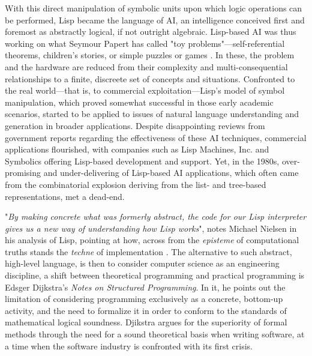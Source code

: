With this direct manipulation of symbolic units upon which logic operations can be performed, Lisp became the language of AI, an intelligence conceived first and foremost as abstractly logical, if not outright algebraic. Lisp-based AI was thus working on what Seymour Papert has called "toy problems"—self-referential theorems, children's stories, or simple puzzles or games \citep{nilsson_early_2009}. In these, the problem and the hardware are reduced from their complexity and multi-consequential relationships to a finite, discreete set of concepts and situations. Confronted to the real world—that is, to commercial exploitation—Lisp's model of symbol manipulation, which proved somewhat successful in those early academic scenarios, started to be applied to issues of natural language understanding and generation in broader applications. Despite disappointing reviews from government reports regarding the effectiveness of these AI techniques, commercial applications flourished, with companies such as Lisp Machines, Inc. and Symbolics offering Lisp-based development and support. Yet, in the 1980s, over-promising and under-delivering of Lisp-based AI applications, which often came from the combinatorial explosion deriving from the list- and tree-based representations, met a dead-end.

\vspace{1\baselineskip}

"\emph{By making concrete what was formerly abstract, the code for our Lisp interpreter gives us a new way of understanding how Lisp works}", notes Michael Nielsen in his analysis of Lisp, pointing at how, across from the \emph{episteme} of computational truths stands the \emph{techne} of implementation \citep{nielsen_lisp_2012}. The alternative to such abstract, high-level language, is then to consider computer science as an engineering discipline, a shift between theoretical programming and practical programming is Edsger Dijkstra's \emph{Notes on Structured Programming}. In it, he points out the limitation of considering programming exclusively as a concrete, bottom-up activity, and the need to formalize it in order to conform to the standards of mathematical logical soundness. Djikstra argues for the superiority of formal methods through the need for a sound theoretical basis when writing software, at a time when the software industry is confronted with its first crisis.

